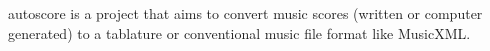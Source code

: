autoscore is a project that aims to convert music scores (written or computer generated) to a tablature or conventional music file format like Music\+X\+ML. 
